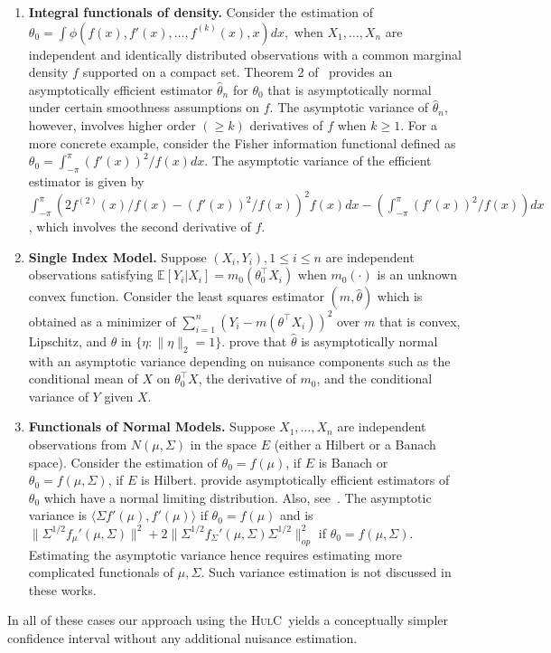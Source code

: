 \documentclass{article}
\newcommand{\hulc}{\textsc{HulC}~}
\numberwithin{myalgctr}{section}
\begin{document}
\begin{enumerate}
	\item \textbf{Integral functionals of density.} Consider the estimation of 
	$\theta_0 = \int \phi(f(x), f'(x), \ldots, f^{(k)}(x), x)dx,$
	when $X_1, \ldots, X_n$ are independent and identically distributed observations {\color{black}with a common marginal density} $f$ supported on a compact set. Theorem 2 of~\cite{laurent1997estimation} provides an asymptotically efficient estimator $\widehat{\theta}_n$ for $\theta_0$ that is asymptotically normal under certain smoothness assumptions on $f$. The asymptotic variance of $\widehat{\theta}_n$, however, involves higher order $(\ge k)$ derivatives of $f$ when $k\ge1$. For a more concrete example, consider the Fisher information {\color{black}functional defined as} $\theta_0 = \int_{-\pi}^{\pi} (f'(x))^2/f(x)dx$. The asymptotic variance of the efficient estimator is given by $\int_{-\pi}^{\pi} (2f^{(2)}(x)/f(x) - (f'(x))^2/f(x))^2f(x)dx - (\int_{-\pi}^{\pi} (f'(x))^2/f(x))dx$, which involves the second derivative of $f$. 
	\item \textbf{Single Index Model.} Suppose $(X_i, Y_i), 1\le i\le n$ are independent observations satisfying $\mathbb{E}[Y_i|X_i] = m_0(\theta_0^{\top}X_i)$ when $m_0(\cdot)$ is an unknown convex function. Consider the least squares estimator $(\widehat{m},\widehat{\theta})$ which is obtained as a minimizer of $\sum_{i=1}^n (Y_i - m(\theta^{\top}X_i))^2$ over $m$ that is convex, Lipschitz, and $\theta$ in $\{\eta:\|\eta\|_2 = 1\}$. \cite{kuchibhotla2021semiparametric} prove that $\widehat{\theta}$ is asymptotically normal with an asymptotic variance depending on nuisance components such as the conditional mean of $X$ on $\theta_0^{\top}X$, the derivative of $m_0$, and the conditional variance of $Y$ given $X$.
	\item \textbf{Functionals of Normal Models.} Suppose $X_1, \ldots, X_n$ are independent observations from $N(\mu,\Sigma)$ in the space $E$ (either a Hilbert or a Banach space). Consider the estimation of $\theta_0 = f(\mu)$, if $E$ is Banach or $\theta_0 = f(\mu,\Sigma)$, if $E$ is Hilbert. \cite{koltchinskii2019estimation,koltchinskii2021efficient} provide asymptotically efficient estimators of $\theta_0$ which have a normal limiting distribution. Also, see~\cite{koltchinskii2020estimation}. The asymptotic variance is $\langle \Sigma f'(\mu), f'(\mu)\rangle$ if $\theta_0 = f(\mu)$ and is $\|\Sigma^{1/2}f_{\mu}'(\mu,\Sigma)\|^2 + 2\|\Sigma^{1/2}f_{\Sigma}'(\mu,\Sigma)\Sigma^{1/2}\|_{op}^2$ if $\theta_0 = f(\mu, \Sigma)$. Estimating the asymptotic variance hence requires estimating more complicated functionals of $\mu, \Sigma$. Such variance estimation is not discussed in these works.  
\end{enumerate}
In all of these cases our approach using the \hulc yields a conceptually simpler confidence interval without any additional nuisance estimation.
\end{document}
